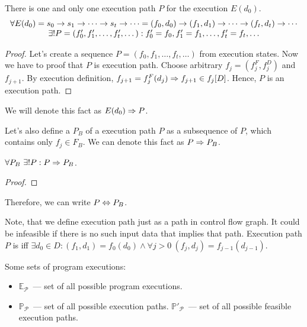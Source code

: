 \begin{lemma}
    There is one and only one execution path $P$ for the execution $E(d_0)$.
    \[ \begin{array}{c}
    \forall E(d_0) = s_0 \rightarrow s_1 \rightarrow \cdots \rightarrow s_t \rightarrow \cdots =
        (f_0, d_0) \rightarrow (f_1, d_1) \rightarrow \cdots \rightarrow (f_t, d_t) \rightarrow \cdots \\
    \exists! P = (f'_0, f'_1, \dots, f'_t, \dots):
        f'_0 = f_0, f'_1 = f_1, \dots, f'_t = f_t, \dots
    \end{array} \]
\end{lemma}

\begin{proof}
    Let's create a sequence $P = (f_0, f_1, \dots, f_t, \dots)$ from
    execution states.
    Now we have to proof that $P$ is execution path.
    Choose arbitrary $f_j = (f_j^F, f_j^D)$ and $f_{j + 1}$.
    By execution definition,
    $f_{j + 1} = f_j^F(d_j) \Rightarrow f_{j + 1} \in f_j[D]$.
    Hence, $P$ is an execution path.
\end{proof}

We will denote this fact as $E(d_0) \Rightarrow P$.

Let's also define a  $P_B$ of a execution path $P$
as a subsequence of $P$, which contains only $f_j \in F_B$.
We can denote this fact as $P \Rightarrow P_B$.


\begin{lemma}
    $\forall P_B \,\, \exists! P: P \Rightarrow P_B$.
\end{lemma}

\begin{proof}
\end{proof}

Therefore, we can write $P \Leftrightarrow P_B$.

Note, that we define execution path just as a path in control flow graph.
It could be infeasible if there is no such input data that implies that path.
Execution path $P$ is  iff
$\exists d_0 \in D: (f_1, d_1) = f_0(d_0) \land
    \forall j > 0 ~ (f_j, d_j) = f_{j - 1}(d_{j - 1})$.

Some sets of program executions:
\begin{itemize}
    \item $\mathds{E}_\mathcal{P}$~--- set of all possible program executions.
    \item $\mathds{P}_\mathcal{P}$~--- set of all possible execution paths.
        $\mathds{P}'_\mathcal{P}$~---
        set of all possible feasible execution paths.
\end{itemize}

